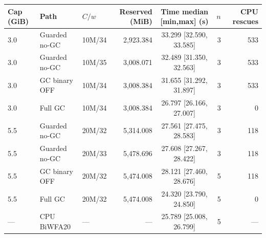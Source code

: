 \begin{tabular}{lllrcrr}
\toprule
Cap (GiB) & Path & $C/w$ & Reserved (MiB) & Time median [min,max] (s) & $n$ & CPU rescues\\
\midrule
3.0 & Guarded no-GC & 10M/34 & 2,923.384 & 33.299 [32.590, 33.585] & 3 & 533\\
3.0 & Guarded no-GC & 10M/35 & 3,008.071 & 32.489 [31.350, 32.563] & 3 & 533\\
3.0 & GC binary OFF & 10M/34 & 3,008.384 & 31.655 [31.292, 31.897] & 3 & 533\\
3.0 & Full GC & 10M/34 & 3,008.384 & 26.797 [26.166, 27.007] & 3 & 0\\
5.5 & Guarded no-GC & 20M/32 & 5,314.008 & 27.561 [27.475, 28.583] & 3 & 118\\
5.5 & Guarded no-GC & 20M/33 & 5,478.696 & 27.608 [27.267, 28.422] & 3 & 118\\
5.5 & GC binary OFF & 20M/32 & 5,474.008 & 28.121 [27.460, 28.676] & 5 & 118\\
5.5 & Full GC & 20M/32 & 5,474.008 & 24.320 [23.790, 24.850] & 5 & 0\\
\midrule
--- & CPU BiWFA20 & --- & --- & 25.789 [25.008, 26.799] & 5 & ---\\
\bottomrule
\end{tabular}
